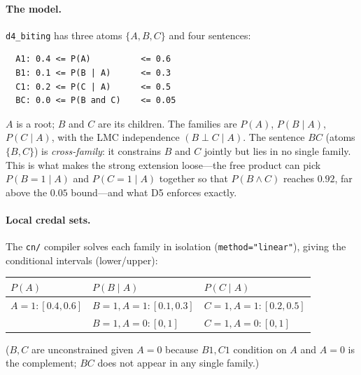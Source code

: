 \documentclass[11pt]{article}
\begin{document}
\paragraph{The model.} \texttt{d4\_biting} has three atoms $\{A,B,C\}$ and four sentences:
\begin{verbatim}
  A1: 0.4 <= P(A)          <= 0.6
  B1: 0.1 <= P(B | A)      <= 0.3
  C1: 0.2 <= P(C | A)      <= 0.5
  BC: 0.0 <= P(B and C)    <= 0.05
\end{verbatim}
$A$ is a root; $B$ and $C$ are its children. The families are $P(A)$, $P(B\mid A)$,
$P(C\mid A)$, with the LMC independence $(B\perp C\mid A)$. The sentence $\mathit{BC}$
(atoms $\{B,C\}$) is \emph{cross-family}: it constrains $B$ and $C$ jointly but lies in no
single family. This is what makes the strong extension loose---the free product can pick
$P(B{=}1\mid A)$ and $P(C{=}1\mid A)$ together so that $P(B\land C)$ reaches $0.92$, far above
the $0.05$ bound---and what D5 enforces exactly.

\paragraph{Local credal sets.} The \texttt{cn/} compiler solves each family in isolation
(\texttt{method="linear"}), giving the conditional intervals (lower/upper):
\begin{center}
\begin{tabular}{lll}
  \toprule
  $P(A)$ & $P(B\mid A)$ & $P(C\mid A)$ \\
  \midrule
  $A{=}1:[0.4,0.6]$ & $B{=}1,A{=}1:[0.1,0.3]$ & $C{=}1,A{=}1:[0.2,0.5]$ \\
                    & $B{=}1,A{=}0:[0,1]$     & $C{=}1,A{=}0:[0,1]$ \\
  \bottomrule
\end{tabular}
\end{center}
($B,C$ are unconstrained given $A{=}0$ because $\mathit{B1},\mathit{C1}$ condition on $A$ and
$A{=}0$ is the complement; $\mathit{BC}$ does not appear in any single family.)
\end{document}

